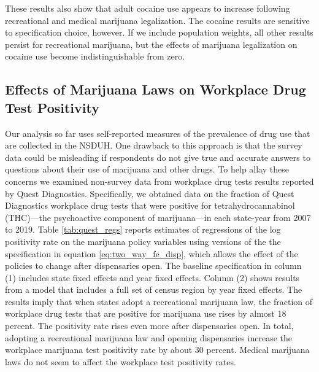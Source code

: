 \documentclass[12pt]{article}%
\begin{document}
These results also show that adult cocaine use appears to increase following recreational and medical marijuana legalization. The cocaine results are sensitive to specification choice, however. If we include population weights, all other results persist for recreational marijuana, but the effects of marijuana legalization on cocaine use become indistinguishable from zero. 

\subsection{Effects of Marijuana Laws on Workplace Drug Test Positivity}
\label{sec:workplace_results}

Our analysis so far uses self-reported measures of the prevalence of drug use that are collected in the NSDUH. 
One drawback to this approach is that the survey data could be misleading if respondents do not give true and accurate answers to questions about their use of marijuana and other drugs. 
To help allay these concerns we examined non-survey data from workplace drug tests results reported by Quest Diagnostics. 
Specifically, we obtained data on the fraction of Quest Diagnostics workplace drug tests that were positive for tetrahydrocannabinol (THC)---the psychoactive component of marijuana---in each state-year from 2007 to 2019. 
Table \ref{tab:quest_regs} reports estimates of regressions of the log positivity rate on the marijuana policy variables using versions of the the specification in equation \ref{eq:two_way_fe_disp}, which allows the effect of the policies to change after dispensaries open. 
The baseline specification in column (1) includes state fixed effects and year fixed effects. 
Column (2) shows results from a model that includes a full set of census region by year fixed effects. 
The results imply that when states adopt a recreational marijuana law, the fraction of workplace drug tests that are positive for marijuana use rises by almost 18 percent. 
The positivity rate rises even more after dispensaries open. 
In total, adopting a recreational marijuana law and opening dispensaries increase the workplace marijuana test positivity rate by about 30 percent. 
Medical marijuana laws do not seem to affect the workplace test positivity rates. 
\end{document}
